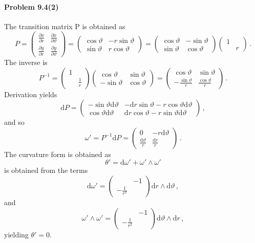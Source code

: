 \documentclass[a4paper,12pt]{article}
\def\d{\mathrm{d}}
\newcommand{\problem}[1]{\paragraph{Problem #1}}
\begin{document}
\problem{9.4(2)} The transition matrix P is obtained as
\[
 P =
 \begin{pmatrix}
  \frac{\partial x}{\partial r} & \frac{\partial x}{\partial \vartheta} \\
  \frac{\partial y}{\partial r} & \frac{\partial y}{\partial \vartheta}
 \end{pmatrix} =
 \begin{pmatrix}
  \cos\vartheta & -r\sin\vartheta \\
  \sin\vartheta & r\cos\vartheta
 \end{pmatrix}=
 \begin{pmatrix}
  \cos\vartheta & -\sin\vartheta \\
  \sin\vartheta & \cos\vartheta
 \end{pmatrix}
  \begin{pmatrix} 1 & \\ & r \end{pmatrix}\,.
\]
The inverse is
\[
 P^{-1} =
  \begin{pmatrix} 1 & \\ & \frac{1}{r} \end{pmatrix} 
  \begin{pmatrix}
  \cos\vartheta & \sin\vartheta \\
  -\sin\vartheta & \cos\vartheta
 \end{pmatrix}=
 \begin{pmatrix}
  \cos\vartheta &\sin\vartheta  \\
   -\frac{\sin\vartheta}{r}& \frac{\cos\vartheta}{r}
 \end{pmatrix}\,.
\]
Derivation yields
\[
 \d P =
 \begin{pmatrix}
  -\sin\vartheta \d \vartheta & -\d r \sin\vartheta - r \cos\vartheta\d\vartheta \\
   \cos\vartheta \d\vartheta& \d r \cos\vartheta - r\sin\vartheta\d\vartheta
 \end{pmatrix}\,,
\]
and so
\[
 \omega'=P^{-1}\d P =
 \begin{pmatrix}
  0 & -r \d\vartheta \\
  \frac{\d\vartheta}{r} & \frac{\d r}{r}
 \end{pmatrix}\,.
\]
The curvature form is obtained as
\[
 \theta' = \d\omega' + \omega'\wedge \omega'
\]
is obtained from the terms
\[
 \d\omega' =
 \begin{pmatrix}
  & -1 \\
  -\frac{1}{r^2} & 
 \end{pmatrix} \d r\wedge\d \vartheta\,,
\]
and
\[
 \omega'\wedge \omega' =
 \begin{pmatrix}
  & -1 \\
  -\frac{1}{r^2} &
 \end{pmatrix}\d\vartheta\wedge \d r\,,
\]
yielding $\theta'=0$.
\end{document}
